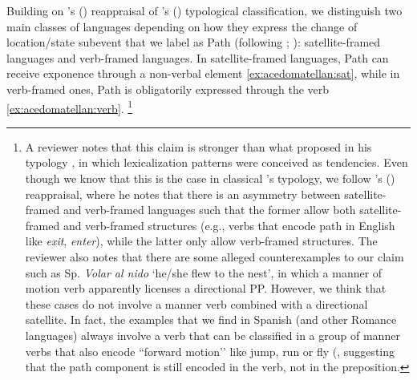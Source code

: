 \documentclass[output=paper,colorlinks,citecolor=brown,
]{langscibook}
\begin{document}
Building on \citeauthor{Acedo-Matellan2010}'s (\citeyear{Acedo-Matellan2010, Acedo-Matellan2016}) reappraisal of \citeauthor{Talmy1991}'s (\citeyear{Talmy1991,Talmy2000}) typological classification, we distinguish two main classes of languages depending on how they express the change of location/state subevent that we label as Path (following \citealt{Acedo-Matellan2010,Acedo-Matellan2016}; \citealt{Acedo-MatellanandMateu2013}): satellite-framed languages and verb-framed languages. In satellite-framed languages, Path can receive exponence through a non-verbal element \ref{ex:acedomatellan:sat}, while in verb-framed ones, Path is obligatorily expressed through the verb \ref{ex:acedomatellan:verb}.
\footnote{A reviewer notes that this claim is stronger than what \citeauthor{Talmy2000} proposed in his typology \citep{Talmy2000}, in which lexicalization patterns were conceived as tendencies. Even though we know that this is the case in classical \citeauthor{Talmy2000}’s typology,  we follow \citeauthor{Acedo-Matellan2016}'s (\citeyear{Acedo-Matellan2016}) reappraisal, where he notes that there is an asymmetry between satellite-framed and verb-framed languages such that the former allow both satellite-framed and verb-framed structures (e.g., verbs that encode path in English like \textit{exit}, \textit{enter}), while the latter only allow verb-framed structures. The reviewer also notes that there are some alleged counterexamples to our claim such as Sp. \textit{Volar al nido }‘he/she flew to the nest’, in which a manner of motion verb apparently licenses a directional PP. However, we think that these cases do not involve a manner verb combined with a directional satellite. In fact, the examples that we find in Spanish (and other Romance languages) always involve a verb that can be classified in a group of manner verbs that also encode ``forward motion’’ like jump, run or fly (\citealt{Nichols2008},  suggesting that the path component is still encoded in the verb, not in the preposition.  %
}
\end{document}

